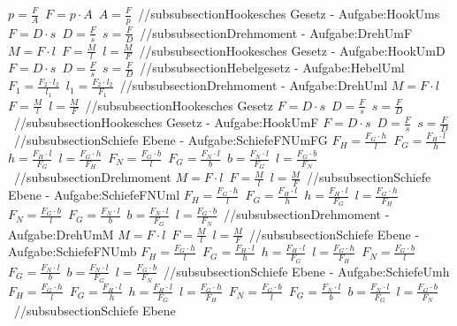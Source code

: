 $ p = \frac{F}{A} $\ 
$ F = p\cdot A $\ 
$ A = \frac{F}{p} $\ 
//subsubsection{Hookesches Gesetz - Aufgabe:HookUms} 
$ F = D\cdot s $\ 
$ D = \frac{F}{s} $\ 
$ s = \frac{F}{D} $\ 
//subsubsection{Drehmoment - Aufgabe:DrehUmF} 
$ M = F\cdot l $\ 
$ F = \frac{M}{l} $\ 
$ l = \frac{M}{F} $\ 
//subsubsection{Hookesches Gesetz - Aufgabe:HookUmD} 
$ F = D\cdot s $\ 
$ D = \frac{F}{s} $\ 
$ s = \frac{F}{D} $\ 
//subsubsection{Hebelgesetz - Aufgabe:HebelUml} 
$ F_{1}  = \frac{F_{2} \cdot l_{2} }{ l_{1} } $\ 
$ l_{1}  = \frac{F_{2} \cdot l_{2} }{ F_{1} } $\ 
//subsubsection{Drehmoment - Aufgabe:DrehUml} 
$ M = F\cdot l $\ 
$ F = \frac{M}{l} $\ 
$ l = \frac{M}{F} $\ 
//subsubsection{Hookesches Gesetz} 
$ F = D\cdot s $\ 
$ D = \frac{F}{s} $\ 
$ s = \frac{F}{D} $\ 
//subsubsection{Hookesches Gesetz - Aufgabe:HookUmF} 
$ F = D\cdot s $\ 
$ D = \frac{F}{s} $\ 
$ s = \frac{F}{D} $\ 
//subsubsection{Schiefe Ebene - Aufgabe:SchiefeFNUmFG} 
$ F_{H}  = \frac{F_{G} \cdot h}{ l} $\ 
$ F_{G}  = \frac{F_{H} \cdot l}{ h} $\ 
$ h = \frac{F_{H} \cdot l}{ F_{G} } $\ 
$ l = \frac{F_{G} \cdot h}{ F_{H} } $\ 
$ F_{N}  = \frac{F_{G} \cdot b}{ l} $\ 
$ F_{G}  = \frac{F_{N} \cdot l}{ b} $\ 
$ b = \frac{F_{N} \cdot l}{ F_{G} } $\ 
$ l = \frac{F_{G} \cdot b}{ F_{N} } $\ 
//subsubsection{Drehmoment} 
$ M = F\cdot l $\ 
$ F = \frac{M}{l} $\ 
$ l = \frac{M}{F} $\ 
//subsubsection{Schiefe Ebene - Aufgabe:SchiefeFNUml} 
$ F_{H}  = \frac{F_{G} \cdot h}{ l} $\ 
$ F_{G}  = \frac{F_{H} \cdot l}{ h} $\ 
$ h = \frac{F_{H} \cdot l}{ F_{G} } $\ 
$ l = \frac{F_{G} \cdot h}{ F_{H} } $\ 
$ F_{N}  = \frac{F_{G} \cdot b}{ l} $\ 
$ F_{G}  = \frac{F_{N} \cdot l}{ b} $\ 
$ b = \frac{F_{N} \cdot l}{ F_{G} } $\ 
$ l = \frac{F_{G} \cdot b}{ F_{N} } $\ 
//subsubsection{Drehmoment - Aufgabe:DrehUmM} 
$ M = F\cdot l $\ 
$ F = \frac{M}{l} $\ 
$ l = \frac{M}{F} $\ 
//subsubsection{Schiefe Ebene - Aufgabe:SchiefeFNUmb} 
$ F_{H}  = \frac{F_{G} \cdot h}{ l} $\ 
$ F_{G}  = \frac{F_{H} \cdot l}{ h} $\ 
$ h = \frac{F_{H} \cdot l}{ F_{G} } $\ 
$ l = \frac{F_{G} \cdot h}{ F_{H} } $\ 
$ F_{N}  = \frac{F_{G} \cdot b}{ l} $\ 
$ F_{G}  = \frac{F_{N} \cdot l}{ b} $\ 
$ b = \frac{F_{N} \cdot l}{ F_{G} } $\ 
$ l = \frac{F_{G} \cdot b}{ F_{N} } $\ 
//subsubsection{Schiefe Ebene - Aufgabe:SchiefeUmh} 
$ F_{H}  = \frac{F_{G} \cdot h}{ l} $\ 
$ F_{G}  = \frac{F_{H} \cdot l}{ h} $\ 
$ h = \frac{F_{H} \cdot l}{ F_{G} } $\ 
$ l = \frac{F_{G} \cdot h}{ F_{H} } $\ 
$ F_{N}  = \frac{F_{G} \cdot b}{ l} $\ 
$ F_{G}  = \frac{F_{N} \cdot l}{ b} $\ 
$ b = \frac{F_{N} \cdot l}{ F_{G} } $\ 
$ l = \frac{F_{G} \cdot b}{ F_{N} } $\ 
//subsubsection{Schiefe Ebene} 

